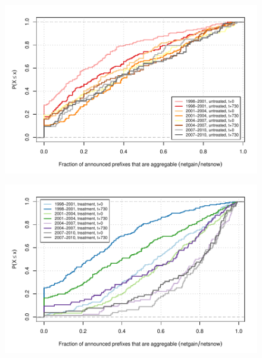 \begin{figure}[H]
\begin{centering}
\begin{singlespace}
    \includegraphics[width=6in]{figures/behavior-frac_deagg-all-special_c.pdf}
    \vspace{-2em}\\
    \caption{}
\end{singlespace}
\end{centering}
\end{figure}

\begin{figure}[H]
\begin{centering}
\begin{singlespace}
    \includegraphics[width=6in]{figures/behavior-frac_deagg-all-special_t.pdf}
    \vspace{-2em}\\
    \caption{}
\end{singlespace}
\end{centering}
\end{figure}



